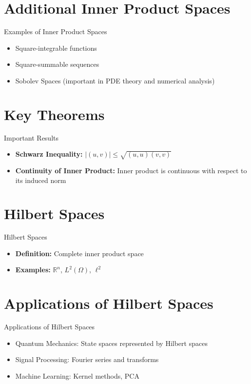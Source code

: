 \documentclass[
	aspectratio=169,    %
	onlytextwidth,        %
	t,                    %
]{beamer}
\begin{document}
\section{Additional Inner Product Spaces}
\begin{frame}{Examples of Inner Product Spaces}
    \begin{itemize}
        \item Square-integrable functions
        \item Square-summable sequences
        \item Sobolev Spaces (important in PDE theory and numerical analysis)
    \end{itemize}
\end{frame}

\section{Key Theorems}
\begin{frame}{Important Results}
    \begin{itemize}
        \item \textbf{Schwarz Inequality:} $|(u,v)| \leq \sqrt{(u,u)(v,v)}$
        \item \textbf{Continuity of Inner Product:} Inner product is continuous with respect to its induced norm
    \end{itemize}
\end{frame}

\section{Hilbert Spaces}
\begin{frame}{Hilbert Spaces}
    \begin{itemize}
        \item \textbf{Definition:} Complete inner product space
        \item \textbf{Examples:} $\mathbb{R}^n$, $L^2(\Omega)$, $\ell^2$
    \end{itemize}
\end{frame}

\section{Applications of Hilbert Spaces}
\begin{frame}{Applications of Hilbert Spaces}
    \begin{itemize}
        \item Quantum Mechanics: State spaces represented by Hilbert spaces
        \item Signal Processing: Fourier series and transforms
        \item Machine Learning: Kernel methods, PCA
    \end{itemize}
\end{frame}
\end{document}
